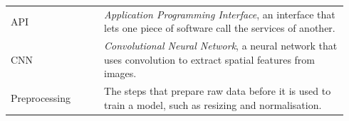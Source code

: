 %


\begin{longtable}{@{}p{0.26\linewidth}p{0.68\linewidth}@{}}
API & \textit{Application Programming Interface}, an interface that lets one piece of software call the services of another. \\
CNN & \textit{Convolutional Neural Network}, a neural network that uses convolution to extract spatial features from images. \\
Preprocessing & The steps that prepare raw data before it is used to train a model, such as resizing and normalisation. \\
\end{longtable}
